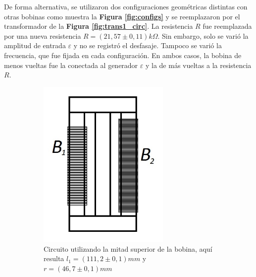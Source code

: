 \documentclass[11pt,a4paper]{article}
\begin{document}
De forma alternativa, se utilizaron dos configuraciones geométricas distintas con otras bobinas como muestra la \textbf{Figura \ref{fig:configs}} y se reemplazaron por el transformador de la \textbf{Figura \ref{fig:trans1_circ}}. La resistencia $R$ fue reemplazada por una nueva resistencia $R = (21,57 \pm 0,11)k\Omega$. Sin embargo, solo se varió la amplitud de entrada $\varepsilon$ y no se registró el desfasaje. Tampoco se varió la frecuencia, que fue fijada en cada configuración. En ambos casos, la bobina de menos vueltas fue la conectada al generador $\varepsilon$ y la de más vueltas a la resistencia $R$.

\begin{figure}[h!]
   \begin{subfigure}{0.5\textwidth}
      \centering
      \includegraphics[width=0.7\textwidth]{configuracion1}
      \caption{Circuito utilizando la mitad superior de la bobina, aquí resulta $l_1 = (111,2 \pm 0,1)mm$ y $r = (46,7 \pm 0,1)mm$}  
      \label{subfig:con1}
   \end{subfigure}
   \begin{subfigure}{0.5\textwidth}
      \centering

\end{subfigure}
\end{figure}
\end{document}
